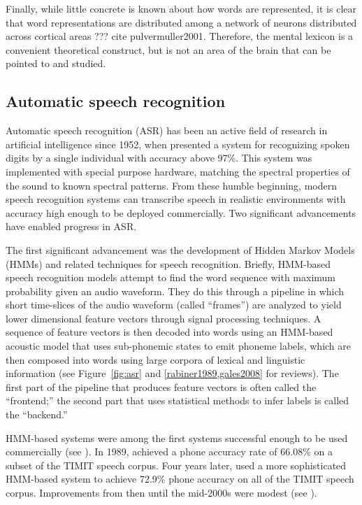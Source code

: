 Finally,
while little concrete is known
about how words are represented,
it is clear that word representations
are distributed among a network
of neurons distributed
across cortical areas
??? cite pulvermuller2001.
Therefore, the mental lexicon
is a convenient theoretical construct,
but is not an area of the brain
that can be pointed to and studied.

\subsection{Automatic speech recognition}

Automatic speech recognition (ASR) has been
an active field of research
in artificial intelligence since 1952,
when \citet{davis1952}
presented a system for recognizing
spoken digits by a single individual
with accuracy above 97\%.
This system was implemented
with special purpose hardware,
matching the spectral properties of
the sound to known spectral patterns.
From these humble beginning,
modern speech recognition systems
can transcribe speech
in realistic environments
with accuracy high enough
to be deployed commercially.
Two significant advancements
have enabled progress in ASR.

The first significant advancement
was the development of
Hidden Markov Models (HMMs)
and related techniques
for speech recognition.
Briefly,
HMM-based speech recognition models
attempt to find the word sequence
with maximum probability given
an audio waveform.
They do this through
a pipeline in which
short time-slices of the audio waveform
(called ``frames'')
are analyzed to yield lower dimensional
feature vectors
through signal processing techniques.
A sequence of feature vectors
is then decoded into words
using an HMM-based acoustic model
that uses sub-phonemic states
to emit phoneme labels,
which are then composed into words
using large corpora of
lexical and linguistic information
(see Figure~\ref{fig:asr} and
\ref{rabiner1989,gales2008} for reviews).
The first part of the pipeline
that produces feature vectors
is often called the ``frontend;''
the second part that uses
statistical methods to infer labels
is called the ``backend.''


HMM-based systems
were among the first systems
successful enough to be
used commercially
(see \citealt{huang2014}).
In 1989, \citet{lee1989}
achieved a phone accuracy rate of %
66.08\% on a subset of the
TIMIT speech corpus.
Four years later,
\citet{lamel1993}
used a more sophisticated HMM-based system
to achieve 72.9\% phone accuracy on
all of the TIMIT speech corpus.
Improvements from then until
the mid-2000s were modest
(see \citealt{lopes2011}).

